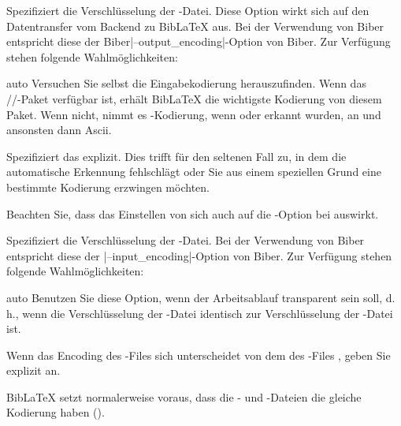 \documentclass{ltxdockit}[2011/03/25]
\newcommand*{\biber}{Biber\xspace}
\newcommand*{\biblatex}{BibLaTeX\xspace}
\begin{document}
\begin{optionlist}

Spezifiziert die Verschlüsselung der -Datei. Diese Option wirkt sich 
auf den 
Datentransfer vom Backend zu \biblatex aus. Bei der Verwendung von \biber entspricht
diese der \biber|--output_encoding|-Option von Biber. Zur Verfügung stehen 
folgende Wahlmöglichkeiten:

\begin{valuelist}
\item[auto] Versuchen Sie selbst die Eingabekodierung herauszufinden.
Wenn das\\
\slash {}\slash {}-Paket verfügbar
ist, erhält \biblatex die wichtigste Kodierung von diesem Paket. Wenn
nicht, nimmt es \utf-Kodierung, wenn \xetex oder \luatex erkannt wurden, an und
ansonsten dann Ascii.

\item[\prm{encoding}] Spezifiziert das  explizit. Dies trifft für den seltenen Fall 
zu, in dem die automatische Erkennung fehlschlägt oder Sie aus einem
speziellen Grund eine bestimmte Kodierung erzwingen möchten.

\end{valuelist}
%
Beachten Sie, dass das Einstellen von 
sich auch auf die
-Option bei  auswirkt.



Spezifiziert die Verschlüsselung der -Datei. Bei der Verwendung von
Biber entspricht diese der |--input_encoding|-Option von Biber. Zur Verfügung stehen 
folgende Wahlmöglichkeiten:

\begin{valuelist}

\item[auto] Benutzen Sie diese Option, wenn der Arbeitsablauf transparent sein
soll, d.\,h., wenn die Verschlüsselung der -Datei identisch zur
Verschlüsselung der -Datei ist. 

\item[\prm{encoding}] Wenn das Encoding des -Files sich
unterscheidet von dem des -Files , geben Sie  explizit an. 

\end{valuelist} 
%
\biblatex setzt normalerweise voraus, dass die - und
-Dateien die gleiche Kodierung haben (). 


\end{optionlist}
\end{document}
